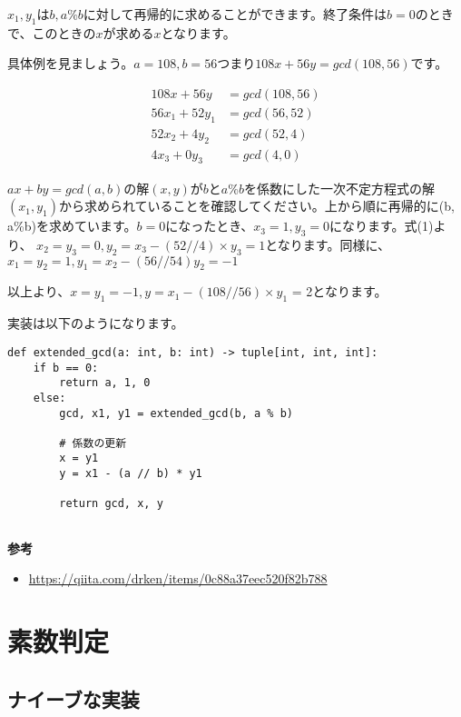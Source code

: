 \documentclass{jlreq}
\begin{document}
$x_1, y_1$は$b, a\%b$に対して再帰的に求めることができます。終了条件は$b = 0$のときで、このときの$x$が求める$x$となります。

具体例を見ましょう。$a = 108, b = 56$つまり$108 x + 56 y = gcd(108, 56)$です。

\begin{align*}
    108 x + 56 y &= gcd(108, 56) \\
    56 x_1 + 52 y_1 &= gcd(56, 52) \\
    52 x_2 + 4 y_2 &= gcd(52, 4) \\
    4 x_3 + 0 y_3 &= gcd(4, 0)
\end{align*}

$a x + by = gcd(a, b)$の解$(x, y)$が$b$と$a\%b$を係数にした一次不定方程式の解$(x_1, y_1)$から求められていることを確認してください。上から順に再帰的に(b, a\%b)を求めています。$b = 0$になったとき、$x_3 = 1, y_3 = 0$になります。式(1)より、
$x_2 = y_3 = 0, y_2 = x_3 - (52//4) \times y_3 = 1$となります。同様に、$x_1 = y_2 = 1, y_1 = x_2 - (56 // 54) y_2 = - 1$

以上より、$x = y_1 = -1, y = x_1 - (108 // 56) \times y_1$ = 2となります。

実装は以下のようになります。

\begin{lstlisting}[caption=拡張ユークリッドの互助法実装, frame=TRBL, label={euclid}]
def extended_gcd(a: int, b: int) -> tuple[int, int, int]:
    if b == 0:
        return a, 1, 0
    else:
        gcd, x1, y1 = extended_gcd(b, a % b)
    
        # 係数の更新
        x = y1
        y = x1 - (a // b) * y1
        
        return gcd, x, y
    

\end{lstlisting}

\textbf{参考}
\begin{itemize}
    \item \url{https://qiita.com/drken/items/0c88a37eec520f82b788}
\end{itemize}

\section{素数判定}

\subsection{ナイーブな実装}
\end{document}
